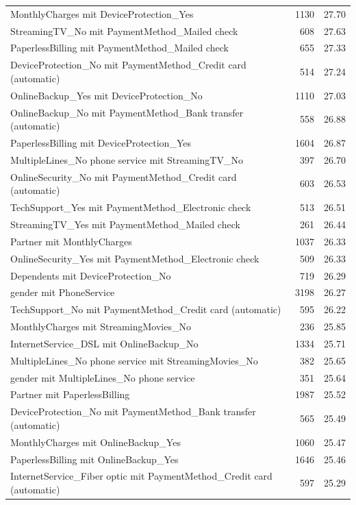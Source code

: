 \documentclass[a4paper,11pt]{article}
\begin{document}
\begin{longtable}{p{9cm}rr}
MonthlyCharges mit DeviceProtection\_Yes & 1130 & 27.70 \\
StreamingTV\_No mit PaymentMethod\_Mailed check & 608 & 27.63 \\
PaperlessBilling mit PaymentMethod\_Mailed check & 655 & 27.33 \\
DeviceProtection\_No mit PaymentMethod\_Credit card (automatic) & 514 & 27.24 \\
OnlineBackup\_Yes mit DeviceProtection\_No & 1110 & 27.03 \\
OnlineBackup\_No mit PaymentMethod\_Bank transfer (automatic) & 558 & 26.88 \\
PaperlessBilling mit DeviceProtection\_Yes & 1604 & 26.87 \\
MultipleLines\_No phone service mit StreamingTV\_No & 397 & 26.70 \\
OnlineSecurity\_No mit PaymentMethod\_Credit card (automatic) & 603 & 26.53 \\
TechSupport\_Yes mit PaymentMethod\_Electronic check & 513 & 26.51 \\
StreamingTV\_Yes mit PaymentMethod\_Mailed check & 261 & 26.44 \\
Partner mit MonthlyCharges & 1037 & 26.33 \\
OnlineSecurity\_Yes mit PaymentMethod\_Electronic check & 509 & 26.33 \\
Dependents mit DeviceProtection\_No & 719 & 26.29 \\
gender mit PhoneService & 3198 & 26.27 \\
TechSupport\_No mit PaymentMethod\_Credit card (automatic) & 595 & 26.22 \\
MonthlyCharges mit StreamingMovies\_No & 236 & 25.85 \\
InternetService\_DSL mit OnlineBackup\_No & 1334 & 25.71 \\
MultipleLines\_No phone service mit StreamingMovies\_No & 382 & 25.65 \\
gender mit MultipleLines\_No phone service & 351 & 25.64 \\
Partner mit PaperlessBilling & 1987 & 25.52 \\
DeviceProtection\_No mit PaymentMethod\_Bank transfer (automatic) & 565 & 25.49 \\
MonthlyCharges mit OnlineBackup\_Yes & 1060 & 25.47 \\
PaperlessBilling mit OnlineBackup\_Yes & 1646 & 25.46 \\
InternetService\_Fiber optic mit PaymentMethod\_Credit card (automatic) & 597 & 25.29 \\

\end{longtable}
\end{document}
